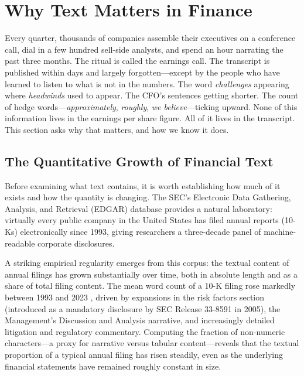 \section{Why Text Matters in Finance}
\label{sec:motivation}

\begin{context}
Every quarter, thousands of companies assemble their executives on a conference
call, dial in a few hundred sell-side analysts, and spend an hour narrating the
past three months.  The ritual is called the earnings call.  The transcript is
published within days and largely forgotten---except by the people who have
learned to listen to what is not in the numbers.  The word \emph{challenges}
appearing where \emph{headwinds} used to appear.  The CFO's sentences getting
shorter.  The count of hedge words---\emph{approximately}, \emph{roughly},
\emph{we believe}---ticking upward.  None of this information lives in the
earnings per share figure.  All of it lives in the transcript.  This section
asks why that matters, and how we know it does.

\subsection{The Quantitative Growth of Financial Text}
\label{sec:motivation-growth}

Before examining what text contains, it is worth establishing how much of it
exists and how the quantity is changing.  The SEC's Electronic Data Gathering,
Analysis, and Retrieval (EDGAR) database provides a natural laboratory:
virtually every public company in the United States has filed annual reports
(10-Ks) electronically since 1993, giving researchers a three-decade panel of
machine-readable corporate disclosures.

A striking empirical regularity emerges from this corpus: the textual content
of annual filings has grown substantially over time, both in absolute length
and as a share of total filing content.  The mean word count of a 10-K filing
rose markedly between 1993 and 2023 \citep{loughran2020textual},
driven by expansions in the risk factors section (introduced as a mandatory
disclosure by SEC Release 33-8591 in 2005), the Management's Discussion and
Analysis narrative, and increasingly detailed litigation and regulatory
commentary.  Computing the fraction of non-numeric characters---a proxy for
narrative versus tabular content---reveals that the textual proportion of a
typical annual filing has risen steadily, even as the underlying financial
statements have remained roughly constant in size.


\end{context}
